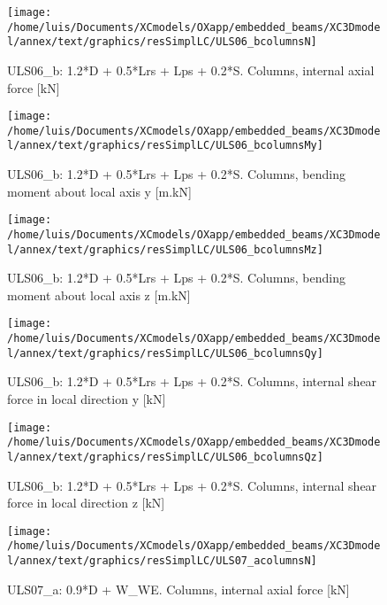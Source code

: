 \clearpage
\begin{figure}
\begin{center}
\texttt{[image: /home/luis/Documents/XCmodels/OXapp/embedded\_beams/XC3Dmodel/annex/text/graphics/resSimplLC/ULS06\_bcolumnsN]}
\caption{ULS06_b: 1.2*D + 0.5*Lrs + Lps + 0.2*S. Columns, internal axial force [kN]}
\end{center}
\end{figure}
\begin{figure}
\begin{center}
\texttt{[image: /home/luis/Documents/XCmodels/OXapp/embedded\_beams/XC3Dmodel/annex/text/graphics/resSimplLC/ULS06\_bcolumnsMy]}
\caption{ULS06_b: 1.2*D + 0.5*Lrs + Lps + 0.2*S. Columns, bending moment about local axis y [m.kN]}
\end{center}
\end{figure}
\begin{figure}
\begin{center}
\texttt{[image: /home/luis/Documents/XCmodels/OXapp/embedded\_beams/XC3Dmodel/annex/text/graphics/resSimplLC/ULS06\_bcolumnsMz]}
\caption{ULS06_b: 1.2*D + 0.5*Lrs + Lps + 0.2*S. Columns, bending moment about local axis z [m.kN]}
\end{center}
\end{figure}
\begin{figure}
\begin{center}
\texttt{[image: /home/luis/Documents/XCmodels/OXapp/embedded\_beams/XC3Dmodel/annex/text/graphics/resSimplLC/ULS06\_bcolumnsQy]}
\caption{ULS06_b: 1.2*D + 0.5*Lrs + Lps + 0.2*S. Columns, internal shear force in local direction y [kN]}
\end{center}
\end{figure}
\begin{figure}
\begin{center}
\texttt{[image: /home/luis/Documents/XCmodels/OXapp/embedded\_beams/XC3Dmodel/annex/text/graphics/resSimplLC/ULS06\_bcolumnsQz]}
\caption{ULS06_b: 1.2*D + 0.5*Lrs + Lps + 0.2*S. Columns, internal shear force in local direction z [kN]}
\end{center}
\end{figure}
\clearpage
\begin{figure}
\begin{center}
\texttt{[image: /home/luis/Documents/XCmodels/OXapp/embedded\_beams/XC3Dmodel/annex/text/graphics/resSimplLC/ULS07\_acolumnsN]}
\caption{ULS07_a: 0.9*D + W_WE. Columns, internal axial force [kN]}
\end{center}
\end{figure}
